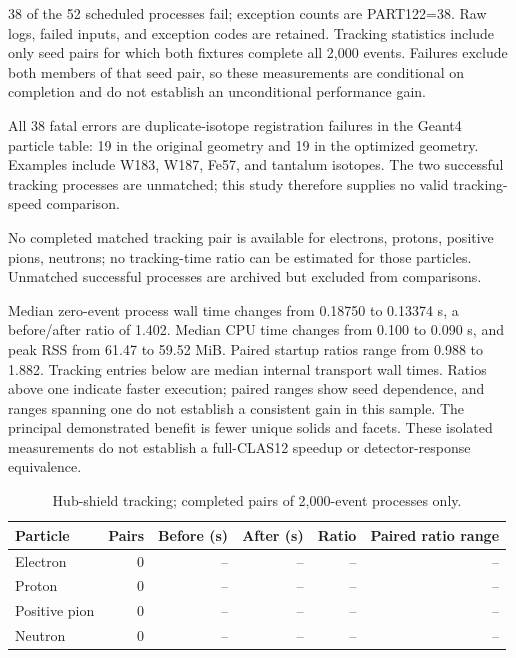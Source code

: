 38 of the 52 scheduled processes fail; exception counts are PART122=38. Raw logs, failed inputs, and exception
codes are retained. Tracking statistics include only seed pairs for which both fixtures complete all 2,000
events. Failures exclude both members of that seed pair, so these measurements are conditional on completion
and do not establish an unconditional performance gain.

All 38 fatal errors are duplicate-isotope registration failures in the Geant4 particle table: 19 in the
original geometry and 19 in the optimized geometry. Examples include W183, W187, Fe57, and tantalum isotopes.
The two successful tracking processes are unmatched; this study therefore supplies no valid tracking-speed
comparison.

No completed matched tracking pair is available for electrons, protons, positive pions, neutrons; no
tracking-time ratio can be estimated for those particles. Unmatched successful processes are archived but
excluded from comparisons.

Median zero-event process wall time changes from 0.18750 to 0.13374 s, a before/after ratio of 1.402. Median
CPU time changes from 0.100 to 0.090 s, and peak RSS from 61.47 to 59.52 MiB. Paired startup ratios range from
0.988 to 1.882. Tracking entries below are median internal transport wall times. Ratios above one indicate
faster execution; paired ranges show seed dependence, and ranges spanning one do not establish a consistent
gain in this sample. The principal demonstrated benefit is fewer unique solids and facets. These isolated
measurements do not establish a full-CLAS12 speedup or detector-response equivalence.

\begin{table}[htbp]
\centering
\setlength{\tabcolsep}{6pt}
\caption{Hub-shield tracking; completed pairs of 2,000-event processes only.}
\label{tab:hub-shields}
\begin{tabular}{lrrrrr}
\toprule
Particle & Pairs & Before (s) & After (s) & Ratio & Paired ratio range \\
\midrule
Electron & 0 & -- & -- & -- & -- \\
Proton & 0 & -- & -- & -- & -- \\
Positive pion & 0 & -- & -- & -- & -- \\
Neutron & 0 & -- & -- & -- & -- \\
\bottomrule
\end{tabular}
\end{table}

